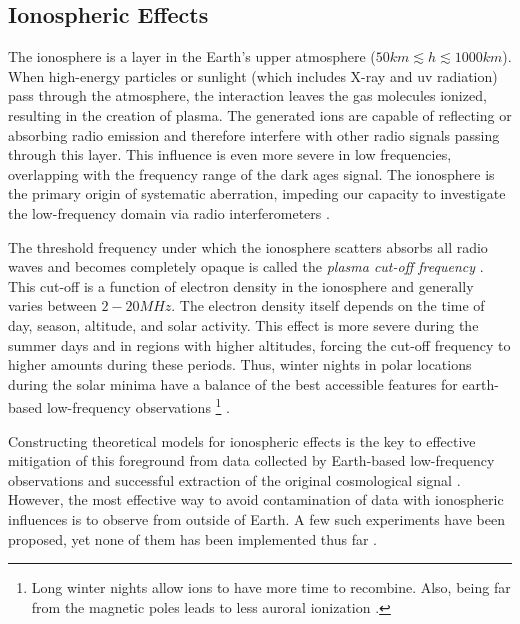 \documentclass[12pt, TexShade, letterpaper]{report}
\begin{document}
\subsection{Ionospheric Effects}
The ionosphere is a layer in the Earth's upper atmosphere ($50km \lesssim h \lesssim 1000 km$). When high-energy particles or sunlight (which includes X-ray and \gls{uv} radiation) pass through the atmosphere, the interaction leaves the gas molecules ionized, resulting in the creation of plasma. The generated ions are capable of reflecting or absorbing radio emission and therefore interfere with other radio signals passing through this layer. This influence is even more severe in low frequencies, overlapping with the frequency range of the dark ages signal. The ionosphere is the primary origin of systematic aberration, impeding our capacity to investigate the low-frequency domain via radio interferometers \cite{thesis_pamela, ionosphere_ultra_low}.\par
The threshold frequency under which the ionosphere scatters absorbs all radio waves and becomes completely opaque is called the \emph{plasma cut-off frequency} \cite{ionosphere_effect_book, thesis_pamela}. This cut-off is a function of electron density in the ionosphere and generally varies between $2-20MHz$. The electron density itself depends on the time of day, season, altitude, and solar activity. This effect is more severe during the summer days and in regions with higher altitudes, forcing the cut-off frequency to higher amounts during these periods. Thus, winter nights in polar locations during the solar minima have a balance of the best accessible features for earth-based low-frequency observations \footnote{Long winter nights allow ions to have more time to recombine. Also, being far from the magnetic poles leads to less auroral ionization \cite{prizm_thesis}.} \cite{thesis_pamela}.\par
Constructing theoretical models for ionospheric effects is the key to effective mitigation of this foreground from data collected by Earth-based low-frequency observations and successful extraction of the original cosmological signal \cite{ionosphere_model, ionosphere_Bayesian}. However, the most effective way to avoid contamination of data with ionospheric influences is to observe from outside of Earth\cite{thesis_shedding}. A few such experiments have been proposed, yet none of them has been implemented thus far \cite{dare_1, dare_2, 21cm_space_interferometer, lunar_orbit_21cm}. \par
\end{document}
